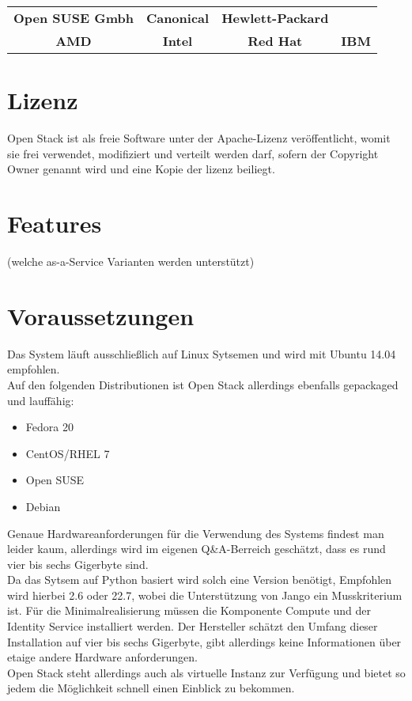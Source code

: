 \documentclass[a4paper,nochapterprefix,ngerman,12pt]{scrreprt}
\begin{document}
\begin{table}[h]
\begin{tabular}{cccc}
\textbf{Open  SUSE Gmbh} & \textbf{Canonical} & \textbf{Hewlett-Packard} &              \\
\textbf{AMD}             & \textbf{Intel}     & \textbf{Red Hat}         & \textbf{IBM}
\end{tabular}
\end{table}
\section{Lizenz}
Open Stack ist als freie Software unter der Apache-Lizenz veröffentlicht, womit sie frei verwendet, modifiziert und verteilt werden darf, sofern der Copyright Owner genannt wird und eine Kopie der lizenz beiliegt.
\section{Features}
(welche as-a-Service Varianten werden unterstützt)
\section{Voraussetzungen}
Das System läuft ausschließlich auf Linux Sytsemen und wird mit Ubuntu 14.04 empfohlen.\\
Auf den folgenden Distributionen ist Open Stack allerdings ebenfalls gepackaged und lauffähig:
\begin{itemize}
	\item Fedora 20
	\item CentOS/RHEL 7
	\item Open SUSE
	\item Debian
\end{itemize}
Genaue Hardwareanforderungen für die Verwendung des Systems findest man leider kaum, allerdings wird im eigenen Q\&A-Berreich geschätzt, dass es rund vier bis sechs Gigerbyte sind.\\
Da das Sytsem auf Python basiert wird solch eine Version benötigt, Empfohlen wird hierbei 2.6 oder 22.7, wobei die Unterstützung von Jango ein Musskriterium ist.
Für die Minimalrealisierung müssen die Komponente Compute und der Identity Service installiert werden. Der Hersteller schätzt den Umfang dieser Installation auf vier bis sechs Gigerbyte, gibt allerdings keine Informationen über etaige andere Hardware anforderungen.\\
Open Stack steht allerdings auch als virtuelle Instanz zur Verfügung und bietet so jedem die Möglichkeit schnell einen Einblick zu bekommen.
\end{document}

